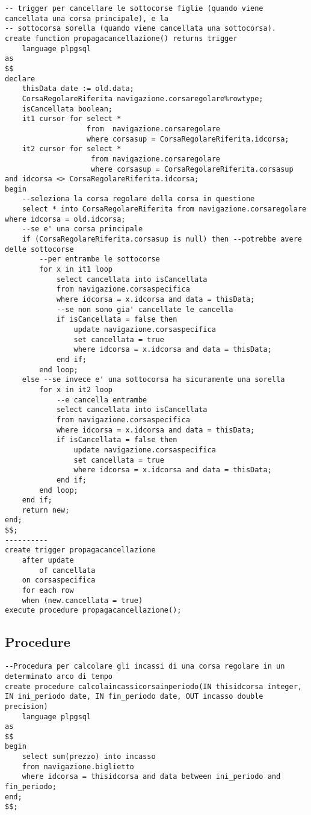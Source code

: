 \begin{lstlisting}[style=sqlstyle]
-- trigger per cancellare le sottocorse figlie (quando viene cancellata una corsa principale), e la
-- sottocorsa sorella (quando viene cancellata una sottocorsa).
create function propagacancellazione() returns trigger
    language plpgsql
as
$$
declare
    thisData date := old.data;
    CorsaRegolareRiferita navigazione.corsaregolare%rowtype;
    isCancellata boolean;
    it1 cursor for select *
                   from  navigazione.corsaregolare
                   where corsasup = CorsaRegolareRiferita.idcorsa;
    it2 cursor for select *
                    from navigazione.corsaregolare
                    where corsasup = CorsaRegolareRiferita.corsasup and idcorsa <> CorsaRegolareRiferita.idcorsa;
begin
    --seleziona la corsa regolare della corsa in questione
    select * into CorsaRegolareRiferita from navigazione.corsaregolare where idcorsa = old.idcorsa;
    --se e' una corsa principale
    if (CorsaRegolareRiferita.corsasup is null) then --potrebbe avere delle sottocorse
        --per entrambe le sottocorse
        for x in it1 loop
            select cancellata into isCancellata
            from navigazione.corsaspecifica
            where idcorsa = x.idcorsa and data = thisData;
            --se non sono gia' cancellate le cancella
            if isCancellata = false then
                update navigazione.corsaspecifica
                set cancellata = true
                where idcorsa = x.idcorsa and data = thisData;
            end if;
        end loop;
    else --se invece e' una sottocorsa ha sicuramente una sorella
        for x in it2 loop
            --e cancella entrambe
            select cancellata into isCancellata
            from navigazione.corsaspecifica
            where idcorsa = x.idcorsa and data = thisData;
            if isCancellata = false then
                update navigazione.corsaspecifica
                set cancellata = true
                where idcorsa = x.idcorsa and data = thisData;
            end if;
        end loop;
    end if;
    return new;
end;
$$;
----------
create trigger propagacancellazione
    after update
        of cancellata
    on corsaspecifica
    for each row
    when (new.cancellata = true)
execute procedure propagacancellazione();
\end{lstlisting}

\subsection{Procedure}
\begin{lstlisting}[style=sqlstyle]
--Procedura per calcolare gli incassi di una corsa regolare in un determinato arco di tempo
create procedure calcolaincassicorsainperiodo(IN thisidcorsa integer, IN ini_periodo date, IN fin_periodo date, OUT incasso double precision)
    language plpgsql
as
$$
begin
    select sum(prezzo) into incasso
    from navigazione.biglietto
    where idcorsa = thisidcorsa and data between ini_periodo and fin_periodo;
end;
$$;

\end{lstlisting}

